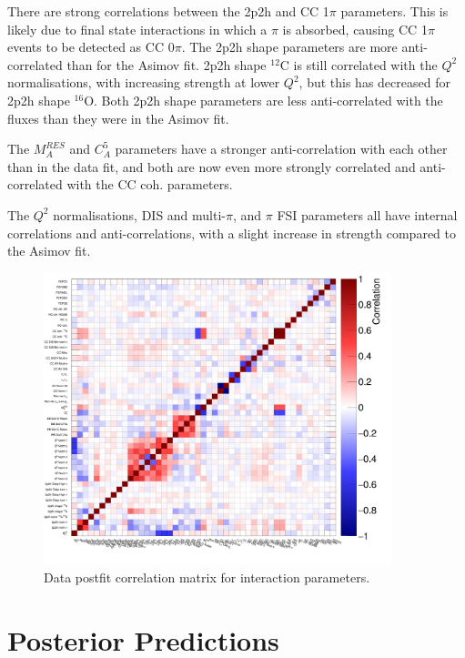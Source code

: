 There are strong correlations between the 2p2h and CC 1$\pi$ parameters. This is likely due to final state interactions in which a $\pi$ is absorbed, causing CC 1$\pi$ events to be detected as CC 0$\pi$. The 2p2h shape parameters are more anti-correlated than for the Asimov fit. 2p2h shape $^{12}$C is still correlated with the $Q^2$ normalisations, with increasing strength at lower $Q^2$, but this has decreased for 2p2h shape $^{16}$O. Both 2p2h shape parameters are less anti-correlated with the fluxes than they were in the Asimov fit.

The $M_{A}^{RES}$ and $C_{A}^5$ parameters have a stronger anti-correlation with each other than in the data fit, and both are now even more strongly correlated and anti-correlated with the CC coh. parameters.

The $Q^2$ normalisations, DIS and multi-$\pi$, and $\pi$ FSI parameters all have internal correlations and anti-correlations, with a slight increase in strength compared to the Asimov fit. 

\begin{figure}[!htbp]
\centering
\includegraphics*[width=0.9\textwidth,clip]{figs/MaCh3DataCorrXsec}
\caption{Data postfit correlation matrix for interaction parameters.}\label{fig:datpostfitcovXsec}
\end{figure}

\section{Posterior Predictions}\label{sec:respostpred}

